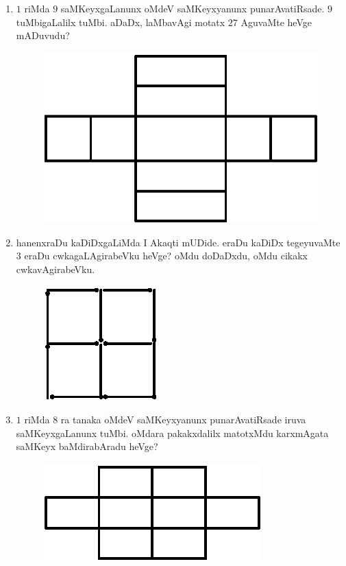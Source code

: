 \begin{enumerate}
\item $1$ riMda $9$ saMKeyxgaLanunx oMdeV saMKeyxyanunx punarAvatiRsade. $9$ tuMbigaLalilx tuMbi. aDaDx, laMbavAgi motatx $27$ AguvaMte heVge mADuvudu?
\begin{figure}[H]
\centering
\includegraphics{src/figures/exr10.eps}
\end{figure}

\item hanenxraDu kaDiDxgaLiMda I Akaqti mUDide. eraDu kaDiDx tegeyuvaMte $3$ eraDu cwkagaLAgirabeVku heVge? oMdu doDaDxdu, oMdu cikakx  cwkavAgirabeVku.
\begin{figure}[H]
\centering
\includegraphics{src/figures/exr11.eps}
\end{figure}

\eject
	

\item $1$ riMda $8$ ra tanaka oMdeV saMKeyxyanunx punarAvatiRsade iruva saMKeyxgaLanunx tuMbi. oMdara pakakxdalilx matotxMdu karxmAgata saMKeyx baMdirabAradu heVge?
\begin{figure}[H]
\centering
\includegraphics{src/figures/exr12.eps}
\end{figure}


\end{enumerate}
